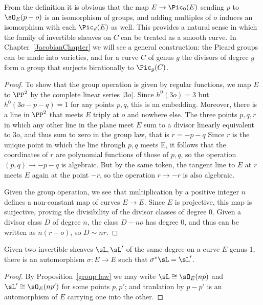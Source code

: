 \begin{remark}
From the definition it is obvious that 
the map
$E \to \Pic_0(E)$ sending $p$ to $\sO_E(p-o)$ is an isomorphism of groups, and adding multiples of $o$
induces an isomorphism with each $\Pic_d(E)$ as well. This provides a natural sense
in which the family of invertible sheaves on $C$ can be treated as a smooth curve.
 In Chapter~\ref{JacobianChapter} we will see a general construction: the Picard groups can be made into
varieties, and for a curve $C$ of genus $g$ the divisors
of degree $g$ form a group that surjects birationally to $\Pic_g(C)$. 
\end{remark}

 
\begin{proof}
To show that the group operation is given by regular functions, we map $E$ to $\PP^2$ by the complete linear series $|3o|$. Since
$h^0(3o) = 3$ but $h^0(3o-p-q) = 1$ for any points $p,q$, this is an embedding. Moreover, there is a line in $\PP^2$ that meets
$E$ triply at $o$ and nowhere else. The three points $p,q,r$ in which any other line in the plane
meet $E$ sum to a divisor linearly equivalent to $3o$, and thus sum to zero in the group law, that is $r = -p-q$ Since $r$ is the unique
point in which the line
through $p,q$ meets  E, it follows that the coordinates of $r$ are polynomial functions of those of $p,q$, so the operation
$(p,q) \to -p-q$ is algebraic. But by the same token, the tangent line to $E$ at $r$ meets $E$ again at the point $-r$,
so the operation $r\to -r$ is also algebraic.

Given the group operation, we see that multiplication by a positive integer $n$ defines a non-constant map of 
curves $E\to E$. Since $E$ is projective, this map is surjective, proving the divisibility of the divisor classes of degree 0. 
Given a divisor class $D$ of degree $n$, the class $D -no$ has degree 0, and thus can be written as $n(r-o)$, so
$D\sim nr$.
\end{proof}

\begin{corollary}\label{equivalence of sheaves}
Given two invertible sheaves $\sL, \sL'$ of the same degree on a curve $E$ genus 1, there is an automorphism $\sigma: E\to E$
such that $\sigma^*\sL = \sL'$.
\end{corollary}

\begin{proof}
By Proposition~\ref{group law} we may write $\sL \cong \sO_E(np)$ and $\sL'\cong \sO_E(np')$ for some points $p,p'$; and tranlation by $p-p'$
is an automorphism of $E$ carrying one into the other.
\end{proof}


